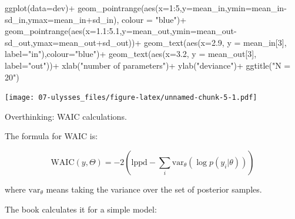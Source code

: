 \documentclass[
]{book}
\newenvironment{Shaded}{\begin{snugshade}}{\end{snugshade}}
\newcommand{\AttributeTok}[1]{\textcolor[rgb]{0.77,0.63,0.00}{#1}}
\newcommand{\DecValTok}[1]{\textcolor[rgb]{0.00,0.00,0.81}{#1}}
\newcommand{\FloatTok}[1]{\textcolor[rgb]{0.00,0.00,0.81}{#1}}
\newcommand{\FunctionTok}[1]{\textcolor[rgb]{0.00,0.00,0.00}{#1}}
\newcommand{\NormalTok}[1]{#1}
\newcommand{\SpecialCharTok}[1]{\textcolor[rgb]{0.00,0.00,0.00}{#1}}
\newcommand{\StringTok}[1]{\textcolor[rgb]{0.31,0.60,0.02}{#1}}
\begin{document}
\begin{Shaded}
\begin{Highlighting}[]
\FunctionTok{ggplot}\NormalTok{(}\AttributeTok{data=}\NormalTok{dev)}\SpecialCharTok{+}
  \FunctionTok{geom\_pointrange}\NormalTok{(}\FunctionTok{aes}\NormalTok{(}\AttributeTok{x=}\DecValTok{1}\SpecialCharTok{:}\DecValTok{5}\NormalTok{,}\AttributeTok{y=}\NormalTok{mean\_in,}\AttributeTok{ymin=}\NormalTok{mean\_in}\SpecialCharTok{{-}}\NormalTok{sd\_in,}\AttributeTok{ymax=}\NormalTok{mean\_in}\SpecialCharTok{+}\NormalTok{sd\_in), }\AttributeTok{colour =} \StringTok{"blue"}\NormalTok{)}\SpecialCharTok{+}
  \FunctionTok{geom\_pointrange}\NormalTok{(}\FunctionTok{aes}\NormalTok{(}\AttributeTok{x=}\FloatTok{1.1}\SpecialCharTok{:}\FloatTok{5.1}\NormalTok{,}\AttributeTok{y=}\NormalTok{mean\_out,}\AttributeTok{ymin=}\NormalTok{mean\_out}\SpecialCharTok{{-}}\NormalTok{sd\_out,}\AttributeTok{ymax=}\NormalTok{mean\_out}\SpecialCharTok{+}\NormalTok{sd\_out))}\SpecialCharTok{+}
  \FunctionTok{geom\_text}\NormalTok{(}\FunctionTok{aes}\NormalTok{(}\AttributeTok{x=}\FloatTok{2.9}\NormalTok{, }\AttributeTok{y =}\NormalTok{ mean\_in[}\DecValTok{3}\NormalTok{], }\AttributeTok{label=}\StringTok{"in"}\NormalTok{),}\AttributeTok{colour=}\StringTok{"blue"}\NormalTok{)}\SpecialCharTok{+}
  \FunctionTok{geom\_text}\NormalTok{(}\FunctionTok{aes}\NormalTok{(}\AttributeTok{x=}\FloatTok{3.2}\NormalTok{, }\AttributeTok{y =}\NormalTok{ mean\_out[}\DecValTok{3}\NormalTok{], }\AttributeTok{label=}\StringTok{"out"}\NormalTok{))}\SpecialCharTok{+}
  \FunctionTok{xlab}\NormalTok{(}\StringTok{"number of parameters"}\NormalTok{)}\SpecialCharTok{+}
  \FunctionTok{ylab}\NormalTok{(}\StringTok{"deviance"}\NormalTok{)}\SpecialCharTok{+}
  \FunctionTok{ggtitle}\NormalTok{(}\StringTok{"N = 20"}\NormalTok{)}
\end{Highlighting}
\end{Shaded}

\texttt{[image: 07-ulysses\_files/figure-latex/unnamed-chunk-5-1.pdf]}

Overthinking: WAIC calculations.

The formula for WAIC is:

\[
\text{WAIC}(y,\Theta) = -2 \left( \text{lppd} - \sum_i \text{var}_\theta ( \log p(y_i | \theta)) \right)
\]

where \(\text{var}_\theta\) means taking the variance over the set of posterior samples.

The book calculates it for a simple model:
\end{document}

